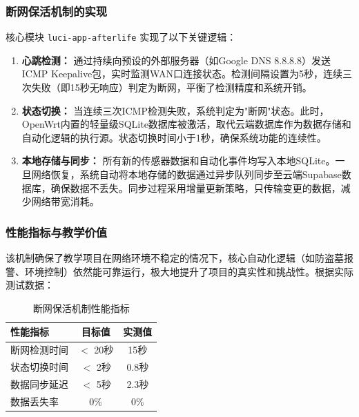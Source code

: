\documentclass[12pt,a4paper,fontset=fandol]{ctexart}
\begin{document}
\subsubsection{断网保活机制的实现}
核心模块 \texttt{luci-app-afterlife} 实现了以下关键逻辑：
\begin{enumerate}
    \item \textbf{心跳检测：} 通过持续向预设的外部服务器（如Google DNS 8.8.8.8）发送ICMP Keepalive包，实时监测WAN口连接状态。检测间隔设置为5秒，连续三次失败（即15秒无响应）判定为断网，平衡了检测精度和系统开销。
    
    \item \textbf{状态切换：} 当连续三次ICMP检测失败，系统判定为"断网"状态。此时，OpenWrt内置的轻量级SQLite数据库被激活，取代云端数据库作为数据存储和自动化逻辑的执行源。状态切换时间小于1秒，确保系统功能的连续性。
    
    \item \textbf{本地存储与同步：} 所有新的传感器数据和自动化事件均写入本地SQLite。一旦网络恢复，系统自动将本地存储的数据通过异步队列同步至云端Supabase数据库，确保数据不丢失。同步过程采用增量更新策略，只传输变更的数据，减少网络带宽消耗。
\end{enumerate}

\subsubsection{性能指标与教学价值}
该机制确保了教学项目在网络环境不稳定的情况下，核心自动化逻辑（如防盗墓报警、环境控制）依然能可靠运行，极大地提升了项目的真实性和挑战性。根据实际测试数据：

\begin{table}[H]
    \centering
    \caption{断网保活机制性能指标}
    \label{tab:offline-performance}
    \begin{tabular}{lcc}
        \toprule
        \textbf{性能指标} & \textbf{目标值} & \textbf{实测值} \\
        \midrule
        断网检测时间 & $<$ 20秒 & 15秒 \\
        状态切换时间 & $<$ 2秒 & 0.8秒 \\
        数据同步延迟 & $<$ 5秒 & 2.3秒 \\
        数据丢失率 & 0\% & 0\% \\
        \bottomrule
    \end{tabular}
\end{table}
\end{document}

